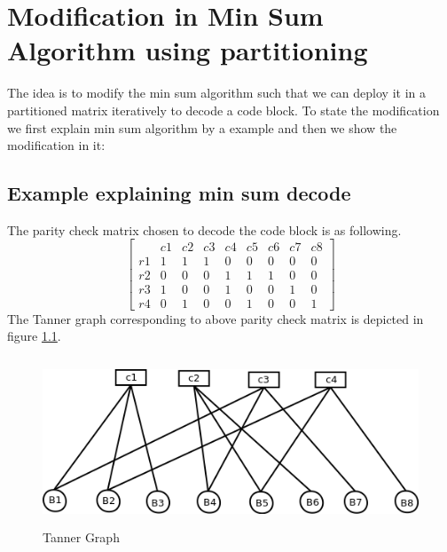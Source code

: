 
\chapter{Modification in Min Sum Algorithm using partitioning}

\label{Chapter7} 


The idea is to modify the min sum algorithm such that we can deploy it in a partitioned matrix iteratively to decode a code block.
To state the modification we first explain min sum algorithm by a example and then we show the modification in it:

\section{Example explaining min sum decode }
The parity check matrix chosen to decode the code block is as following.
\[
\left[ \begin{array} {c|cccccccc} 
  &    c1 &   c2 &   c3 &  c4  &  c5  &  c6  &  c7  &  c8 \\ \hline
r1 &    1  &   1  &   1  &   0  &   0  &   0  &   0  &   0 \\
r2 &    0  &   0  &   0  &   1  &   1  &   1  &   0  &   0 \\ 
r3 &    1  &   0  &   0  &   1  &   0  &   0  &   1  &   0 \\
r4 &    0  &   1  &   0  &   0  &   1  &   0  &   0  &   1 \end{array} \right] 
\]			
The Tanner graph corresponding to above parity check  matrix is depicted in figure \ref{Tanner Graph}.
\\
\begin{figure}[h!]
\centering
\includegraphics[height=5cm,width=12cm]{minSum1}
\caption[Tanner Graph]{Tanner Graph}
\label{Tanner Graph}
\end{figure}

